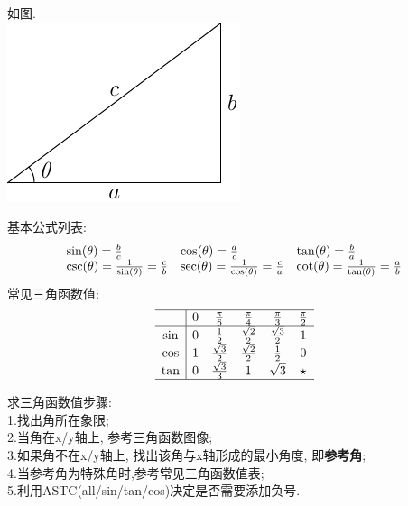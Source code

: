 \documentclass[UTTF8, fontset=ubuntu]{ctexart}
\begin{document}
如图.\\
\includegraphics{triangel.pdf}

基本公式列表:\\
\begin{displaymath}
\begin{array}{l l l}
    \sin(\theta)=\frac{b}{c} & \cos(\theta)=\frac{a}{c} & \tan(\theta)=\frac{b}{a}\\
    \csc(\theta)=\frac{1}{\sin(\theta)}=\frac{c}{b} & \sec(\theta)=\frac{1}{\cos(\theta)}=\frac{c}{a} & \cot(\theta)=\frac{1}{\tan(\theta)}=\frac{a}{b}
\end{array}
\end{displaymath}
常见三角函数值:
\begin{displaymath}
\begin{array}{c|c c c c c}
\hline
    & 0 & \frac{\pi}{6} & \frac{\pi}{4} & \frac{\pi}{3} & \frac{\pi}{2}\\
\hline
    \sin & 0 & \frac{1}{2} & \frac{\sqrt{2}}{2} & \frac{\sqrt{3}}{2} & 1\\
    \cos & 1 & \frac{\sqrt{3}}{2} & \frac{\sqrt{2}}{2} & \frac{1}{2} & 0\\
    \tan & 0 & \frac{\sqrt{3}}{3} & 1 & \sqrt{3} & \star\\
\hline
\end{array}
\end{displaymath}

求三角函数值步骤:\\
1.找出角所在象限;\\
2.当角在x/y轴上, 参考三角函数图像;\\
3.如果角不在x/y轴上, 找出该角与x轴形成的最小角度, 即\textbf{参考角};\\
4.当参考角为特殊角时,参考常见三角函数值表;\\
5.利用ASTC(all/sin/tan/cos)决定是否需要添加负号.
\end{document}
